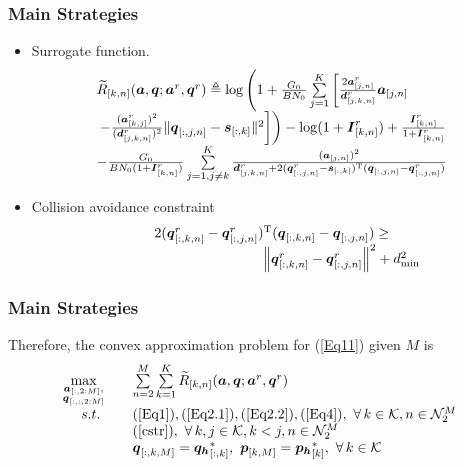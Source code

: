 \documentclass[handout,11.5pt]{beamer}
\begin{document}
\begin{frame}
	\frametitle{Main Strategies}
	\begin{itemize}
		\item<1-> Surrogate function. 
		\begin{equation}\label{surro}
			\begin{array}{ll}
			\widetilde{R}_{[k,n]}(\boldsymbol{a},\boldsymbol{q};\boldsymbol{a}^r,\boldsymbol{q}^r) \triangleq\log\left(1+\frac{G_0}{BN_0}\sum\limits_{j=1}^K\left[\frac{2\boldsymbol{a}^r_{[j,n]}}{\boldsymbol{d}^r_{[j,k,n]}}\boldsymbol{a}_{[j,n]}\right.\right. \\
			\left.\left.-\frac{(\boldsymbol{a}^r_{[k,j]})^2}{(\boldsymbol{d}^r_{[j,k,n]})^2}\lVert\boldsymbol{q}_{[:,j,n]}-\boldsymbol{s}_{[:,k]}\rVert^2\right]\right)-\log(1+\boldsymbol{I}^r_{[k,n]})+\frac{\boldsymbol{I}^r_{[k,n]}}{1+\boldsymbol{I}^r_{[k,n]}} \\
			-\frac{G_0}{BN_0(1+\boldsymbol{I}^r_{[k,n]})}\sum\limits_{j=1,j\ne k}^{K}\frac{(\boldsymbol{a}_{[j,n]})^2}{\boldsymbol{d}^r_{[j,k,n]}+2(\boldsymbol{q}^r_{[:,j,n]}-\boldsymbol{s}_{[:,k]})^{\rm T}(\boldsymbol{q}_{[:,j,n]}-\boldsymbol{q}^r_{[:,j,n]})}
			\end{array}
		\end{equation}
		\item<2-> Collision avoidance constraint
		\begin{equation}\label{cstr}
			\begin{array}{c}
			2(\boldsymbol{q}^r_{[:,k,n]}-\boldsymbol{q}^r_{[:,j,n]})^{\rm T}(\boldsymbol{q}_{[:,k,n]}-\boldsymbol{q}_{[:,j,n]})\geq  \\
			\qquad\qquad\qquad\qquad\qquad\left\lVert\boldsymbol{q}^r_{[:,k,n]}-\boldsymbol{q}^r_{[:,j,n]}\right\rVert^2+d_{\min}^2
			\end{array}
		\end{equation}
	\end{itemize}
\end{frame}


\begin{frame}
\frametitle{Main Strategies}
Therefore, the convex approximation problem for (\ref{Eq11}) given $M$ is
\begin{equation}\label{cvxapprox}
	\begin{array}{cll}
	\max\limits_{\substack{\boldsymbol{a}_{[:,2:M]},\\ \boldsymbol{q}_{[:,:,2:M]}}}\quad & \sum\limits_{n=2}^{M}\sum\limits_{k=1}^K \widetilde{R}_{[k,n]}(\boldsymbol{a},\boldsymbol{q};\boldsymbol{a}^r,\boldsymbol{q}^r) \\ 
	s.t.  & (\ref{Eq1}),(\ref{Eq2.1}),(\ref{Eq2.2}),(\ref{Eq4}),\ \forall\,k\in\mathcal{K},n\in\mathcal{N}_2^M \\
	& (\ref{cstr}),\ \forall\,k,j\in\mathcal{K},k<j,n\in\mathcal{N}_2^M \\
	& \boldsymbol{q}_{[:,k,M]}=\boldsymbol{q_h}^*_{[:,k]},\   \boldsymbol{p}_{[k,M]} = \boldsymbol{p_h}^*_{[k]},\  \forall\,k\in\mathcal{K}
	\end{array}
\end{equation}

\end{frame}
\end{document}
